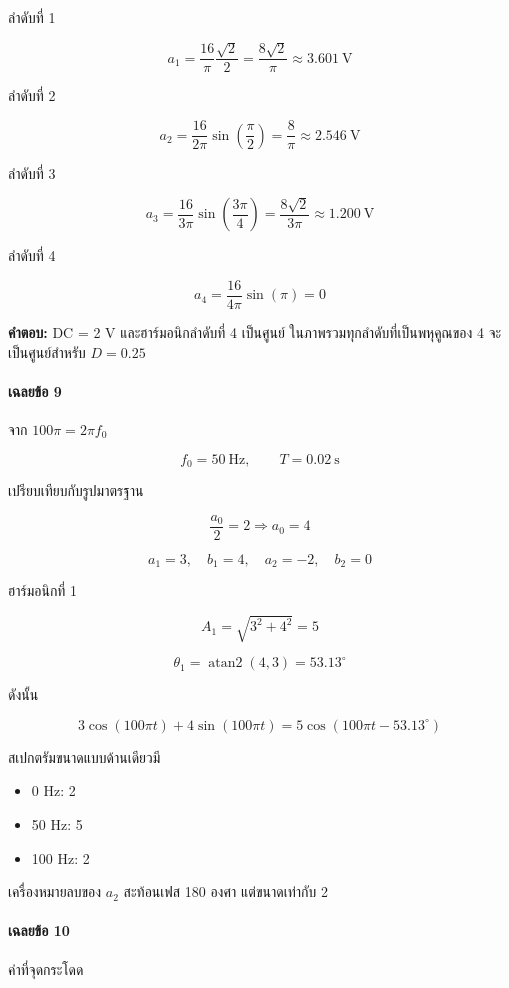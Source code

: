 ลำดับที่ 1

\[
a_1=\frac{16}{\pi}\frac{\sqrt2}{2}
=\frac{8\sqrt2}{\pi}\approx3.601\ \text{V}
\]

ลำดับที่ 2

\[
a_2=\frac{16}{2\pi}\sin\left(\frac{\pi}{2}\right)
=\frac{8}{\pi}\approx2.546\ \text{V}
\]

ลำดับที่ 3

\[
a_3=\frac{16}{3\pi}\sin\left(\frac{3\pi}{4}\right)
=\frac{8\sqrt2}{3\pi}\approx1.200\ \text{V}
\]

ลำดับที่ 4

\[
a_4=\frac{16}{4\pi}\sin(\pi)=0
\]

\textbf{คำตอบ:} DC = 2 V และฮาร์มอนิกลำดับที่ 4 เป็นศูนย์ ในภาพรวมทุกลำดับที่เป็นพหุคูณของ 4 จะเป็นศูนย์สำหรับ \(D=0.25\)

\paragraph{เฉลยข้อ 9}

จาก \(100\pi=2\pi f_0\)

\[
f_0=50\ \text{Hz},\qquad T=0.02\ \text{s}
\]

เปรียบเทียบกับรูปมาตรฐาน

\[
\frac{a_0}{2}=2\Rightarrow a_0=4
\]

\[
a_1=3,\quad b_1=4,\quad a_2=-2,\quad b_2=0
\]

ฮาร์มอนิกที่ 1

\[
A_1=\sqrt{3^2+4^2}=5
\]

\[
\theta_1=\operatorname{atan2}(4,3)=53.13^\circ
\]

ดังนั้น

\[
3\cos(100\pi t)+4\sin(100\pi t)
=5\cos(100\pi t-53.13^\circ)
\]

สเปกตรัมขนาดแบบด้านเดียวมี

\begin{itemize}
\item
  0 Hz: 2
\item
  50 Hz: 5
\item
  100 Hz: 2
\end{itemize}

เครื่องหมายลบของ \(a_2\) สะท้อนเฟส 180 องศา แต่ขนาดเท่ากับ 2

\paragraph{เฉลยข้อ 10}

ค่าที่จุดกระโดด

